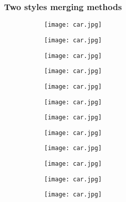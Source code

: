 \subsubsection{Two styles merging methods}
\begin{figure}[h!]
	\centering
	\begin{subfigure}[b]{0.13\linewidth}
		\texttt{[image: car.jpg]} %
	\end{subfigure}
	\begin{subfigure}[b]{0.13\linewidth}
		\texttt{[image: car.jpg]} %
	\end{subfigure}
	\begin{subfigure}[b]{0.13\linewidth}
		\texttt{[image: car.jpg]} %
	\end{subfigure}
	\begin{subfigure}[b]{0.13\linewidth}
		\texttt{[image: car.jpg]} %
	\end{subfigure}
	\begin{subfigure}[b]{0.13\linewidth}
		\texttt{[image: car.jpg]} %
	\end{subfigure}
	\begin{subfigure}[b]{0.13\linewidth}
		\texttt{[image: car.jpg]} %
	\end{subfigure}
	\begin{subfigure}[b]{0.13\linewidth}
		\texttt{[image: car.jpg]} %
	\end{subfigure}
	\centering
	\begin{subfigure}[b]{0.13\linewidth}
		\texttt{[image: car.jpg]} %
	\end{subfigure}
	\begin{subfigure}[b]{0.13\linewidth}
		\texttt{[image: car.jpg]} %
	\end{subfigure}
	\begin{subfigure}[b]{0.13\linewidth}
		\texttt{[image: car.jpg]} %
	\end{subfigure}
	\begin{subfigure}[b]{0.13\linewidth}
		\texttt{[image: car.jpg]} %
	\end{subfigure}
	\begin{subfigure}[b]{0.13\linewidth}
		\texttt{[image: car.jpg]} %

\end{subfigure}
\end{figure}

